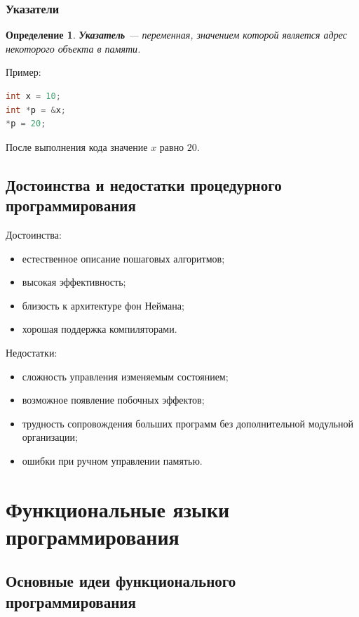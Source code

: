 \documentclass[12pt,a4paper]{article}
\newtheorem{definition}{Определение}
\begin{document}
\subsubsection{Указатели}

\begin{definition}
\textbf{Указатель} --- переменная, значением которой является адрес некоторого объекта в памяти.
\end{definition}

Пример:
\begin{lstlisting}[language=C]
int x = 10;
int *p = &x;
*p = 20;
\end{lstlisting}

После выполнения кода значение $x$ равно $20$.

\subsection{Достоинства и недостатки процедурного программирования}

Достоинства:
\begin{itemize}
    \item естественное описание пошаговых алгоритмов;
    \item высокая эффективность;
    \item близость к архитектуре фон Неймана;
    \item хорошая поддержка компиляторами.
\end{itemize}

Недостатки:
\begin{itemize}
    \item сложность управления изменяемым состоянием;
    \item возможное появление побочных эффектов;
    \item трудность сопровождения больших программ без дополнительной модульной организации;
    \item ошибки при ручном управлении памятью.
\end{itemize}

\section{Функциональные языки программирования}

\subsection{Основные идеи функционального программирования}
\end{document}
